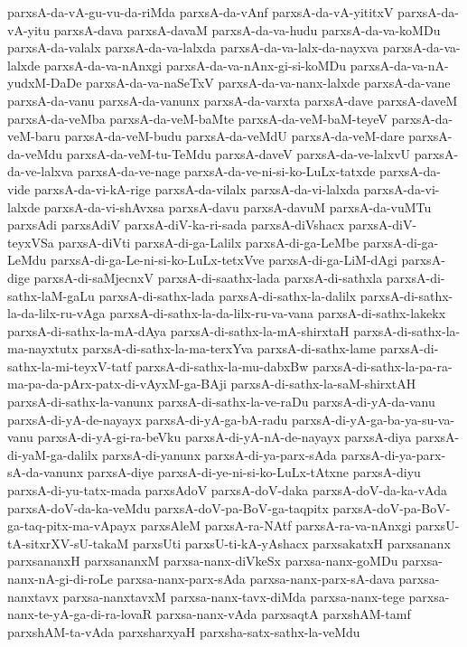 {parxsA-da-vA-gu-vu-da-riMda
parxsA-da-vAnf
parxsA-da-vA-yititxV
parxsA-da-vA-yitu
parxsA-dava
parxsA-davaM
parxsA-da-va-hudu
parxsA-da-va-koMDu
parxsA-da-valalx
parxsA-da-va-lalxda
parxsA-da-va-lalx-da-nayxva
parxsA-da-va-lalxde
parxsA-da-va-nAnxgi
parxsA-da-va-nAnx-gi-si-koMDu
parxsA-da-va-nA-yudxM-DaDe
parxsA-da-va-naSeTxV
parxsA-da-va-nanx-lalxde
parxsA-da-vane
parxsA-da-vanu
parxsA-da-vanunx
parxsA-da-varxta
parxsA-dave
parxsA-daveM
parxsA-da-veMba
parxsA-da-veM-baMte
parxsA-da-veM-baM-teyeV
parxsA-da-veM-baru
parxsA-da-veM-budu
parxsA-da-veMdU
parxsA-da-veM-dare
parxsA-da-veMdu
parxsA-da-veM-tu-TeMdu
parxsA-daveV
parxsA-da-ve-lalxvU
parxsA-da-ve-lalxva
parxsA-da-ve-nage
parxsA-da-ve-ni-si-ko-LuLx-tatxde
parxsA-da-vide
parxsA-da-vi-kA-rige
parxsA-da-vilalx
parxsA-da-vi-lalxda
parxsA-da-vi-lalxde
parxsA-da-vi-shAvxsa
parxsA-davu
parxsA-davuM
parxsA-da-vuMTu
parxsAdi
parxsAdiV
parxsA-diV-ka-ri-sada
parxsA-diVshacx
parxsA-diV-teyxVSa
parxsA-diVti
parxsA-di-ga-Lalilx
parxsA-di-ga-LeMbe
parxsA-di-ga-LeMdu
parxsA-di-ga-Le-ni-si-ko-LuLx-tetxVve
parxsA-di-ga-LiM-dAgi
parxsA-dige
parxsA-di-saMjecnxV
parxsA-di-saathx-lada
parxsA-di-sathxla
parxsA-di-sathx-laM-gaLu
parxsA-di-sathx-lada
parxsA-di-sathx-la-dalilx
parxsA-di-sathx-la-da-lilx-ru-vAga
parxsA-di-sathx-la-da-lilx-ru-va-vana
parxsA-di-sathx-lakekx
parxsA-di-sathx-la-mA-dAya
parxsA-di-sathx-la-mA-shirxtaH
parxsA-di-sathx-la-ma-nayxtutx
parxsA-di-sathx-la-ma-terxYva
parxsA-di-sathx-lame
parxsA-di-sathx-la-mi-teyxV-tatf
parxsA-di-sathx-la-mu-dabxBw
parxsA-di-sathx-la-pa-ra-ma-pa-da-pArx-patx-di-vAyxM-ga-BAji
parxsA-di-sathx-la-saM-shirxtAH
parxsA-di-sathx-la-vanunx
parxsA-di-sathx-la-ve-raDu
parxsA-di-yA-da-vanu
parxsA-di-yA-de-nayayx
parxsA-di-yA-ga-bA-radu
parxsA-di-yA-ga-ba-ya-su-va-vanu
parxsA-di-yA-gi-ra-beVku
parxsA-di-yA-nA-de-nayayx
parxsA-diya
parxsA-di-yaM-ga-dalilx
parxsA-di-yanunx
parxsA-di-ya-parx-sAda
parxsA-di-ya-parx-sA-da-vanunx
parxsA-diye
parxsA-di-ye-ni-si-ko-LuLx-tAtxne
parxsA-diyu
parxsA-di-yu-tatx-mada
parxsAdoV
parxsA-doV-daka
parxsA-doV-da-ka-vAda
parxsA-doV-da-ka-veMdu
parxsA-doV-pa-BoV-ga-taqpitx
parxsA-doV-pa-BoV-ga-taq-pitx-ma-vApayx
parxsAleM
parxsA-ra-NAtf
parxsA-ra-va-nAnxgi
parxsU-tA-sitxrXV-sU-takaM
parxsUti
parxsU-ti-kA-yAshacx
parxsakatxH
parxsananx
parxsananxH
parxsananxM
parxsa-nanx-diVkeSx
parxsa-nanx-goMDu
parxsa-nanx-nA-gi-di-roLe
parxsa-nanx-parx-sAda
parxsa-nanx-parx-sA-dava
parxsa-nanxtavx
parxsa-nanxtavxM
parxsa-nanx-tavx-diMda
parxsa-nanx-tege
parxsa-nanx-te-yA-ga-di-ra-lovaR
parxsa-nanx-vAda
parxsaqtA
parxshAM-tamf
parxshAM-ta-vAda
parxsharxyaH
parxsha-satx-sathx-la-veMdu
}
